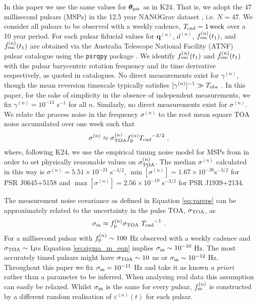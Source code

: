 \documentclass[fleqn,usenatbib,useAMS]{mnras}
\begin{document}
In this paper we use the same values for $\boldsymbol{\theta}_{\rm psr}$ as in K24. That is, we adopt the 47 millisecond pulsars (MSPs) in the 12.5 year NANOGrav dataset \citep{2020ApJ...905L..34A}, i.e. $N = 47$. We consider all pulsars to be observed with a weekly cadence, $T_{\rm cad} = 1 \,{\rm week}$ over a 10 year period. For each pulsar fiducial values for ${\boldsymbol{q}}^{(n)}$, $d^{(n)}$, $f_{\rm em}^{(n)}(t_1)$, and $\dot{f}^{(n)}_{\rm em}(t_1)$ are obtained via the Australia Telescope National Facility (ATNF) pulsar catalogue \citep{Manchester2005} using the \texttt{psrqpy} package \citep{psrqpy}. We identify $f_{\rm em}^{(n)} (t_1)$ and $\dot{f}_{\rm em}^{(n)} (t_1)$ with the pulsar barycentric rotation frequency and its time derivative respectively, as quoted in catalogues. No direct measurements exist for $\gamma^{(n)}$, though the mean reversion timescale typically satisfies $[\gamma^{(n)}]^{-1} \gg T_{\rm obs}$ \citep{Price2012,Myers2021MNRAS.502.3113M,Meyers2021,Vargas}. In this paper, for the sake of simplicity in the absence of independent measurements, we fix $\gamma^{(n)} = 10^{-13}$ s$^{-1}$ for all $n$. Similarly, no direct measurements exist for $\sigma^{(n)}$.   We relate the process noise in the frequency $\sigma^{(n)}$ to the root mean square TOA noise accumulated over one week such that
\begin{eqnarray}
	\sigma^{(n)} \approx \sigma_{\rm TOA}^{(n)} f_{\rm p}^{(n)} {T_{\rm cad}}^{-3/2} \ . \label{eq:sigmap_f}
\end{eqnarray}
where, following K24, we use the empirical timing noise model for MSPs from \cite{Shannon2010ApJ...725.1607S} in order to set physically reasonable values on $\sigma_{\rm TOA}^{(n)}$.  The median $\sigma^{(n)}$ calculated in this way is $\sigma^{(n)} = 5.51 \times 10^{-24} $ s$^{-3/2}$, $\min [ \sigma^{(n)} ] = 1.67 \times 10^{-26}$s$^{-3/2}$ for PSR J0645+5158 and $\max [ \sigma^{(n)} ] = 2.56 \times 10^{-19}$ s$^{-3/2}$ for PSR J1939+2134. 


The measurement noise covariance as defined in Equation \eqref{eq:vareps} can be approximately related to the uncertainty in the pulse TOA, $\sigma_{\rm TOA}$, as
\begin{equation}
	\sigma_{\rm m} \approx f_{\rm p}^{(n)} \sigma_{\rm TOA} \ {T_{\rm cad}}^{-1} \ . \label{eq:sigma_m_eqn}
\end{equation}
For a millisecond pulsar with $f_{\rm p}^{(n)} \sim 100$ Hz observed with a weekly cadence and $\sigma_{\rm TOA} \sim 1 \mu$s Equation \eqref{eq:sigma_m_eqn} implies $\sigma_{\rm m} \sim 10^{-10}$ Hz. The most accurately timed pulsars might have $\sigma_{\rm TOA} \sim 10 $ ns or $\sigma_{\rm m} \sim 10^{-12}$ Hz. Throughout this paper we fix $\sigma_{\rm m} = 10^{-11}$ Hz and take it as known \textit{a priori} rather than a parameter to be inferred. When analysing real data this assumption can easily be relaxed. Whilst $\sigma_{\rm m}$ is the same for every pulsar, $f_{\rm m} ^{(n)}$ is constructed by a different random realisation of $\varepsilon^{(n)}(t)$ for each pulsar. \newline 
\end{document}
